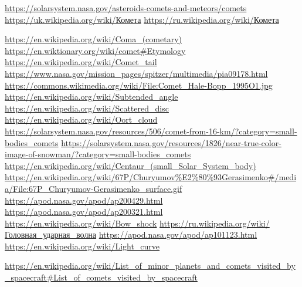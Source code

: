 \documentclass[a4paper]{article}
\begin{document}
    \begin{thebibliography}{3}
        {\small{} \url{https://solarsystem.nasa.gov/asteroids-comets-and-meteors/comets}}
        {\small{} \href{https://uk.wikipedia.org/wiki/\%D0\%9A\%D0\%BE\%D0\%BC\%D0\%B5\%D1\%82\%D0\%B0}{https://uk.wikipedia.org/wiki/Комета}}
        {\small{} \href{https://ru.wikipedia.org/wiki/\%D0\%9A\%D0\%BE\%D0\%BC\%D0\%B5\%D1\%82\%D0\%B0}{https://ru.wikipedia.org/wiki/Комета}}
        
        {\small{}      \url{https://en.wikipedia.org/wiki/Coma_(cometary)}}
        {\small{}      \url{https://en.wiktionary.org/wiki/comet#Etymology}}
        {\small{}      \url{https://en.wikipedia.org/wiki/Comet_tail}}
        {\small{}      \url{https://www.nasa.gov/mission_pages/spitzer/multimedia/pia09178.html}}
        {\small{}      \url{https://commons.wikimedia.org/wiki/File:Comet_Hale-Bopp_1995O1.jpg}}
        {\small{}      \url{https://en.wikipedia.org/wiki/Subtended_angle}}
        {\small{}     \url{https://en.wikipedia.org/wiki/Scattered_disc}}
        {\small{}     \url{https://en.wikipedia.org/wiki/Oort_cloud}}
        {\small{}     \url{https://solarsystem.nasa.gov/resources/506/comet-from-16-km/?category=small-bodies_comets}}
        {\small{}     \url{https://solarsystem.nasa.gov/resources/1826/near-true-color-image-of-snowman/?category=small-bodies_comets}}
        {\small{}     \url{https://en.wikipedia.org/wiki/Centaur_(small_Solar_System_body)}}
        {\small{}     \url{https://en.wikipedia.org/wiki/67P/Churyumov\%E2\%80\%93Gerasimenko#/media/File:67P_Churyumov-Gerasimenko_surface.gif}}
        {\small{}     \url{https://apod.nasa.gov/apod/ap200429.html}}
        {\small{}     \url{https://apod.nasa.gov/apod/ap200321.html}}
        {\small{}     \url{https://en.wikipedia.org/wiki/Bow_shock}}
        {\small{}     \href{https://ru.wikipedia.org/wiki/\%D0\%93\%D0\%BE\%D0\%BB\%D0\%BE\%D0\%B2\%D0\%BD\%D0\%B0\%D1\%8F_\%D1\%83\%D0\%B4\%D0\%B0\%D1\%80\%D0\%BD\%D0\%B0\%D1\%8F_\%D0\%B2\%D0\%BE\%D0\%BB\%D0\%BD\%D0\%B0}{https://ru.wikipedia.org/wiki/Головная\_ударная\_волна}}
        {\small{}     \url{https://apod.nasa.gov/apod/ap101123.html}}
        {\small{}     \url{https://en.wikipedia.org/wiki/Light_curve}}
        
        {\small{} \url{https://en.wikipedia.org/wiki/List_of_minor_planets_and_comets_visited_by_spacecraft#List_of_comets_visited_by_spacecraft}}
    \end{thebibliography}
\end{document}
